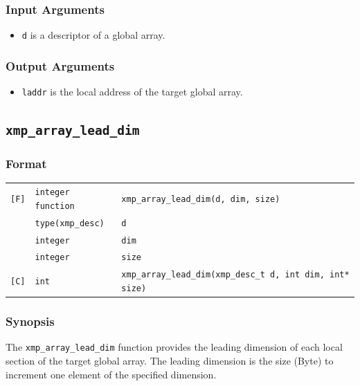 \subsubsection*{Input Arguments}
\begin{itemize}
 \item {\tt d} is a descriptor of a global array.
\end{itemize}

\subsubsection*{Output Arguments}
\begin{itemize}
 \item {\tt laddr} is the local address of the target global array.
\end{itemize}


\subsection{\tt xmp\_array\_lead\_dim}\label{subsec:xmparrayleaddim}

\subsubsection*{Format}

\begin{tabular}{lll}

\verb![F]!& {\tt integer function}& {\tt xmp\_array\_lead\_dim(d, dim, size)}\\
          & {\tt type(xmp\_desc)} & {\tt d}\\
          & {\tt integer} & {\tt dim}\\
          & {\tt integer} & {\tt size}\\
          
\verb![C]!&  {\tt int}& {\tt xmp\_array\_lead\_dim(xmp\_desc\_t d, int dim, int* size)}\\

\end{tabular}

\subsubsection*{Synopsis}

The {\tt xmp\_array\_lead\_dim} function provides the leading dimension
of each local section of the target global array.
The leading dimension is the size (Byte) to increment one element of the specified dimension.


